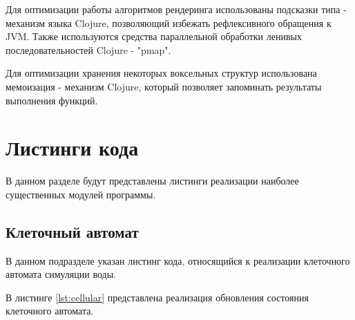 Для оптимизации работы алгоритмов рендеринга использованы подсказки типа - механизм
языка Clojure, позволяющий избежать рефлексивного обращения к JVM. Также используются
средства параллельной обработки ленивых последовательностей Clojure - "pmap".

Для оптимизации хранения некоторых воксельных структур использована мемоизация -
механизм Clojure, который позволяет запоминать результаты выполнения функций.

\section{Листинги кода}

В данном разделе будут представлены листинги реализации наиболее существенных
модулей программы.

\subsection{Клеточный автомат}

В данном подразделе указан листинг кода, относящийся к реализации клеточного автомата
симуляции воды.

В листинге \ref{lst:cellular} представлена реализация обновления состояния клеточного автомата.

